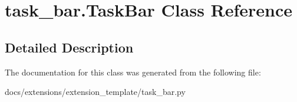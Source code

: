 \hypertarget{classtask__bar_1_1TaskBar}{\section{task\-\_\-bar.\-Task\-Bar Class Reference}
\label{classtask__bar_1_1TaskBar}
}


\subsection{Detailed Description}
\begin{DoxyVerb}\end{DoxyVerb}
 

The documentation for this class was generated from the following file\-:\begin{DoxyCompactItemize}
\item 
docs/extensions/extension\-\_\-template/task\-\_\-bar.\-py\end{DoxyCompactItemize}
